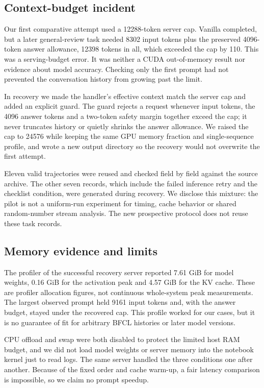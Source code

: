 \documentclass[conference]{IEEEtran}
\begin{document}
\subsection{Context-budget incident}
Our first comparative attempt used a 12288-token server cap. Vanilla completed, but a later general-review task needed 8302 input tokens plus the preserved 4096-token answer allowance, 12398 tokens in all, which exceeded the cap by 110. This was a serving-budget error. It was neither a CUDA out-of-memory result nor evidence about model accuracy. Checking only the first prompt had not prevented the conversation history from growing past the limit.

In recovery we made the handler's effective context match the server cap and added an explicit guard. The guard rejects a request whenever input tokens, the 4096 answer tokens and a two-token safety margin together exceed the cap; it never truncates history or quietly shrinks the answer allowance. We raised the cap to 24576 while keeping the same GPU memory fraction and single-sequence profile, and wrote a new output directory so the recovery would not overwrite the first attempt.

Eleven valid trajectories were reused and checked field by field against the source archive. The other seven records, which include the failed inference retry and the checklist condition, were generated during recovery. We disclose this mixture: the pilot is not a uniform-run experiment for timing, cache behavior or shared random-number stream analysis. The new prospective protocol does not reuse these task records.

\subsection{Memory evidence and limits}
The profiler of the successful recovery server reported 7.61 GiB for model weights, 0.16 GiB for the activation peak and 4.57 GiB for the KV cache. These are profiler allocation figures, not continuous whole-system peak measurements. The largest observed prompt held 9161 input tokens and, with the answer budget, stayed under the recovered cap. This profile worked for our cases, but it is no guarantee of fit for arbitrary BFCL histories or later model versions.

CPU offload and swap were both disabled to protect the limited host RAM budget, and we did not load model weights or server memory into the notebook kernel just to read logs. The same server handled the three conditions one after another. Because of the fixed order and cache warm-up, a fair latency comparison is impossible, so we claim no prompt speedup.
\end{document}
